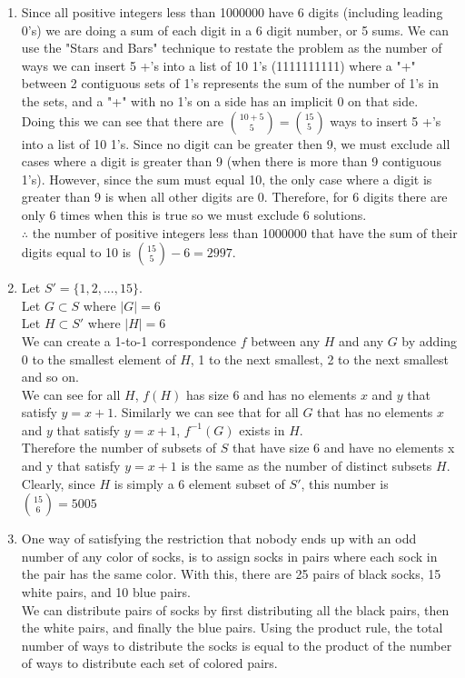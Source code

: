 \documentclass[11pt]{article}
\begin{document}
\begin{enumerate}[]
\item
	Since all positive integers less than 1000000 have 6 digits (including leading 0's) we are doing a sum of each digit in a 6 digit number, or 5 sums. We can use the "Stars and Bars" technique to restate the problem as the number of ways we can insert 5 +'s into a list of 10 1's (1111111111) where a "+" between 2 contiguous sets of 1's represents the sum of the number of 1's in the sets, and a "+" with no 1's on a side has an implicit 0 on that side.\\
	Doing this we can see that there are $\binom{10+5}{5} = \binom{15}{5}$ ways to insert 5 +'s into a list of 10 1's. Since no digit can be greater then 9, we must exclude all cases where a digit is greater than 9 (when there is more than 9 contiguous 1's). However, since the sum must equal 10, the only case where a digit is greater than 9 is when all other digits are 0. Therefore, for 6 digits there are only 6 times when this is true so we must exclude 6 solutions.\\
	$\therefore$ the number of positive integers less than 1000000 that have the sum of their digits equal to 10 is $\binom{15}{5} - 6 = 2997$.
\item
	Let $S'=\{1,2,...,15\}$.\\
	Let $G \subset S$ where $|G|=6$\\
	Let $H \subset S'$ where $|H|=6$\\
	We can create a 1-to-1 correspondence $f$ between any $H$ and any  $G$ by adding 0 to the smallest element of $H$, 1 to the next smallest, 2 to the next smallest and so on.\\
	We can see for all $H$, $f(H)$ has size 6 and has no elements  $x$ and $y$ that satisfy $y=x+1$. Similarly we can see that for all $G$ that has no elements  $x$ and $y$ that satisfy $y=x+1$, $f^{-1}(G)$ exists in $H$.\\
	Therefore the number of subsets of $S$ that have size 6 and have no elements x and y that satisfy $y=x+1$ is the same as the number of distinct subsets $H$. Clearly, since $H$ is simply a 6 element subset of $S'$, this number is $\binom{15}{6} = 5005$
\item
	 One way of satisfying the restriction that nobody ends up with an odd number of any color of socks, is to assign socks in pairs where each sock in the pair has the same color. With this, there are 25 pairs of black socks, 15 white pairs, and 10 blue pairs.\\
	 We can distribute pairs of socks by first distributing all the black pairs, then the white pairs, and finally the blue pairs. Using the product rule, the total number of ways to distribute the socks is equal to the product of the number of ways to distribute each set of colored pairs.\\

\end{enumerate}
\end{document}
